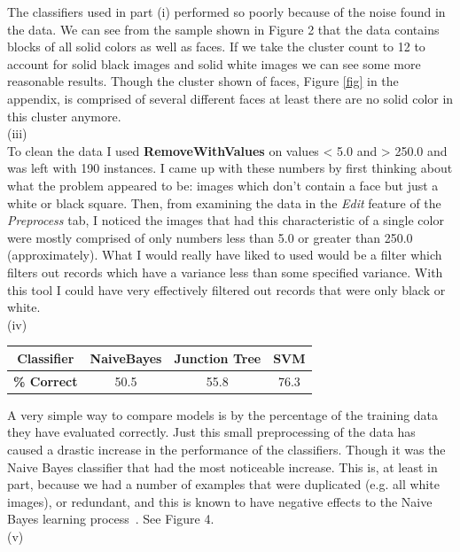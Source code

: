 \documentclass{report}
\begin{document}
The classifiers used in part (i) performed so poorly because of the
noise found in the data. We can see from the sample shown in Figure 2
that the data contains blocks of all solid colors as well as faces. If
we take the cluster count to 12 to account for solid black images and
solid white images we can see some more reasonable results. Though the
cluster shown of faces, Figure \ref{fig} in the appendix, is comprised of several different faces at
least there are no solid color in this cluster anymore.\\
(iii)\\
To clean the data I used {\bf RemoveWithValues} on values < 5.0 and >
250.0 and was left with 190
instances. I came up with these numbers by first thinking about what
the problem appeared to be: images which don't contain a face but just
a white or black square. Then, from examining the data in the \emph{Edit}
feature of the \emph{Preprocess} tab, I noticed the images
that had this characteristic of a single color were mostly comprised of
only numbers less than 5.0 or greater than 250.0 (approximately). What
I would really have liked to used would be a filter which filters out
records which have a variance less than some specified variance. With
this tool I could have very effectively filtered out records that were
only black or white.\\
(iv)\\
\begin{center}
  \begin{tabular}{|c|c|c|c|}
    \hline
    {\bf Classifier} & {\bf NaiveBayes} & {\bf Junction Tree} & {\bf SVM}\\
    \hline
    {\bf \% Correct} & 50.5 & 55.8 & 76.3\\
    \hline
  \end{tabular}
\end{center}
A very simple way to compare models is by the percentage of the
training data they have evaluated correctly. Just this small
preprocessing of the data has caused a drastic increase in the
performance of the classifiers. Though it was the Naive Bayes
classifier that had the most noticeable increase. This is, at least in
part, because we
had a number of examples that were duplicated (e.g. all white images),
or redundant, and this is known to have negative effects to the
Naive Bayes learning process~\cite{DM}. See Figure 4.\\
(v)\\
\end{document}
